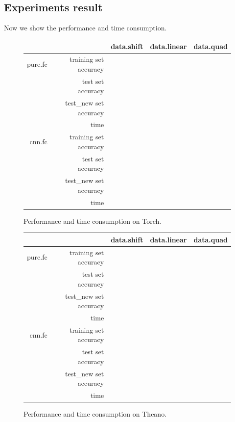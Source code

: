 \documentclass[a4paper]{article}
\begin{document}
\subsection{Experiments result}

Now we show the performance and time consumption.

\begin{figure}[H]
\centering
\begin{tabular}{|r|r|c|c|c|}
\hline
 & & data.shift & data.linear & data.quad \\
\hline
pure.fc & training set accuracy & \\
 & test set accuracy & \\
 & test\_new set accuracy & \\
 & time & \\
\hline
cnn.fc & training set accuracy & \\
 & test set accuracy & \\
 & test\_new set accuracy & \\
 & time & \\
\hline
\end{tabular}
\caption{Performance and time consumption on Torch.}
\end{figure}

\begin{figure}[H]
\centering
\begin{tabular}{|r|r|c|c|c|}
\hline
 & & data.shift & data.linear & data.quad \\
\hline
pure.fc & training set accuracy & \\
 & test set accuracy & \\
 & test\_new set accuracy & \\
 & time & \\
\hline
cnn.fc & training set accuracy & \\
 & test set accuracy & \\
 & test\_new set accuracy & \\
 & time & \\
\hline
\end{tabular}
\caption{Performance and time consumption on Theano.}
\end{figure}
\end{document}
